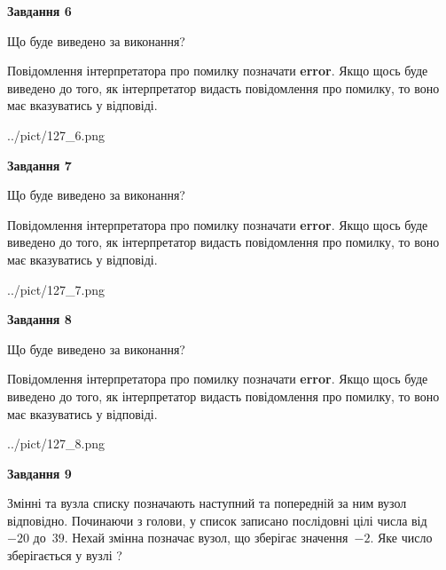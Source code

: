 \documentclass[12pt, ukrainian]{article}
\begin{document}
{\begin {large}
{\begin {center}\textbf{Завдання 6}\end {center}}\par
Що буде виведено за виконання?

Повідомлення інтерпретатора про помилку позначати \textbf{error}.
Якщо щось буде виведено до того, як інтерпретатор видасть повідомлення про помилку, 
то воно має вказуватись у відповіді. \par


\begin{center}
	{../pict/127_6.png}
\end{center}
\newpage

{\begin {center}\textbf{Завдання 7}\end {center}}\par
Що буде виведено за виконання?

Повідомлення інтерпретатора про помилку позначати \textbf{error}.
Якщо щось буде виведено до того, як інтерпретатор видасть повідомлення про помилку, 
то воно має вказуватись у відповіді. \par


\begin{center}
	{../pict/127_7.png}
\end{center}
\newpage

{\begin {center}\textbf{Завдання 8}\end {center}}\par
Що буде виведено за виконання?

Повідомлення інтерпретатора про помилку позначати \textbf{error}.
Якщо щось буде виведено до того, як інтерпретатор видасть повідомлення про помилку, 
то воно має вказуватись у відповіді. \par


\begin{center}
	{../pict/127_8.png}
\end{center}
\newpage

{\begin {center}\textbf{Завдання 9}\end {center}}\par
Змінні  та  вузла списку позначають наступний та попередній за ним вузол відповідно. Починаючи з голови, у список записано послідовні цілі числа від~$-20$ до~$39$. Нехай змінна  позначає вузол, що зберігає значення~$-2$.
Яке число зберігається у вузлі  ?\par
\newpage


\end{large}}
\end{document}
